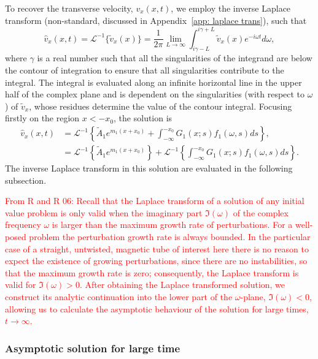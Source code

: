 \documentclass[12pt, draft]{../style-files/ociamthesis}
\begin{document}
To recover the transverse velocity, $v_x(x, t)$, we employ the inverse Laplace transform (non-standard, discussed in Appendix~\ref{app: laplace trans}), such that
\begin{equation}
\hat{v}_x(x,t) = \mathcal{L}^{-1}\{\tilde{v}_x(x)\} = \frac{1}{2\pi} \lim_{L \to \infty} \int_{i\gamma - L}^{i\gamma + L} \tilde{v}_x(x) e^{-i\omega t} d\omega,
\label{laplace transform}
\end{equation}
where $\gamma$ is a real number such that all the singularities of the integrand are below the contour of integration to ensure that all singularities contribute to the integral. The integral is evaluated along an infinite horizontal line in the upper half of the complex plane and is dependent on the singularities (with respect to $\omega$) of $\tilde{v}_x$, whose residues determine the value of the contour integral. Focusing firstly on the region $x < -x_0$, the solution is
\begin{align}
\hat{v}_x(x, t) &= \mathcal{L}^{-1} \left\{ \tilde{A}_1 e^{m_1(x + x_0)} + \int_{-\infty}^{-x_0} G_1(x; s)f_1(\omega, s)ds \right\}, \\
&= \mathcal{L}^{-1} \left\{ \tilde{A}_1 e^{m_1(x + x_0)} \right\} + \mathcal{L}^{-1} \left\{ \int_{-\infty}^{-x_0} G_1(x; s)f_1(\omega, s)ds \right\}.
\end{align}
The inverse Laplace transform in this solution are evaluated in the following subsection. 

\textcolor{red}{ From R and R 06: Recall that the Laplace transform of a solution of any initial value problem is only valid when the imaginary part $\Im(\omega)$ of the complex frequency $\omega$ is larger than the maximum growth rate of perturbations. For a well-posed problem the perturbation growth rate is always bounded. In the particular case of a straight, untwisted, magnetic tube of interest here there is no reason to expect the existence of growing perturbations, since there are no instabilities, so that the maximum growth rate is zero; consequently, the Laplace transform is valid for $\Im(\omega) > 0$. After obtaining the Laplace transformed solution, we construct its analytic continuation into the lower part of the $\omega$-plane, $\Im(\omega) < 0$, allowing us to calculate the asymptotic behaviour of the solution for large times, $t \to \infty$.}

\color{red}
\subsubsection{Asymptotic solution for large time}
\end{document}
